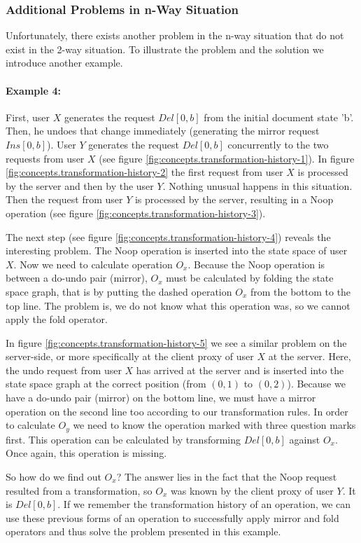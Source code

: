 \subsubsection{Additional Problems in n-Way Situation}
Unfortunately, there exists another problem in the n-way situation that do not exist in the 2-way situation. To illustrate the problem and the solution we introduce another example.

\paragraph{Example 4:} First, user $X$ generates the request $Del[0,b]$ from the initial document state 'b'. Then, he undoes that change immediately (generating the mirror request $Ins[0,b]$). User $Y$ generates the request $Del[0,b]$ concurrently to the two requests from user $X$ (see figure \ref{fig:concepts.transformation-history-1}). In figure \ref{fig:concepts.transformation-history-2} the first request from user $X$ is processed by the server and then by the user $Y$. Nothing unusual happens in this situation. Then the request from user $Y$ is processed by the server, resulting in a Noop operation (see figure \ref{fig:concepts.transformation-history-3}).

The next step (see figure \ref{fig:concepts.transformation-history-4}) reveals the interesting problem. The Noop operation is inserted into the state space of user $X$. Now we need to calculate operation $O_{x}$. Because the Noop operation is between a do-undo pair (mirror), $O_{x}$ must be calculated by folding the state space graph, that is by putting the dashed operation $O_{x}$ from the bottom to the top line. The problem is, we do not know what this operation was, so we cannot apply the fold operator.

In figure \ref{fig:concepts.transformation-history-5} we see a similar problem on the server-side, or more specifically at the client proxy of user $X$ at the server. Here, the undo request from user $X$ has arrived at the server and is inserted into the state space graph at the correct position (from $(0,1)$ to $(0,2)$). Because we have a do-undo pair (mirror) on the bottom line, we must have a mirror operation on the second line too according to our transformation rules. In order to calculate $O_{y}$ we need to know the operation marked with three question marks first. This operation can be calculated by transforming $Del[0,b]$ against $O_{x}$. Once again, this operation is missing.

So how do we find out $O_{x}$? The answer lies in the fact that the Noop request resulted from a transformation, so $O_{x}$ was known by the client proxy of user $Y$. It is $Del[0,b]$. If we remember the transformation history of an operation, we can use these previous forms of an operation to successfully apply mirror and fold operators and thus solve the problem presented in this example.

